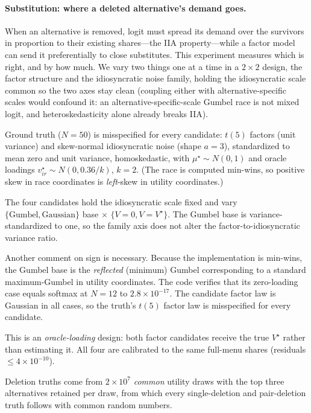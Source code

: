 \documentclass[12pt]{article}
\theoremstyle{remark}
\begin{document}
\paragraph{Substitution: where a deleted alternative's demand goes.}
When an alternative is removed, logit must spread its demand over the
survivors in proportion to their existing shares---the IIA property---while
a factor model can send it preferentially to close substitutes. This
experiment measures which is right, and by how much. We vary two things
one at a time in a $2\times2$ design, the factor structure and the
idiosyncratic noise family, holding the idiosyncratic scale common so
the two axes stay clean (coupling either with alternative-specific
scales would confound it: an alternative-specific-scale Gumbel race is
not mixed logit, and heteroskedasticity alone already breaks IIA).

Ground truth ($N = 50$) is misspecified for every candidate: $t(5)$ factors
(unit variance) and skew-normal idiosyncratic noise (shape $a = 3$),
standardized to mean zero and unit variance, homoskedastic, with $\mu^\star
\sim N(0,1)$ and oracle loadings $v^\star_{ir} \sim N(0, 0.36/k)$, $k=2$.
(The race is computed min-wins, so positive skew in race coordinates is
\emph{left}-skew in utility coordinates.)

The four candidates hold the idiosyncratic scale fixed and vary
$\{\text{Gumbel}, \text{Gaussian}\}$ base $\times$ $\{V = 0, V =
V^\star\}$. The Gumbel base is variance-standardized to one, so the
family axis does not alter the factor-to-idiosyncratic variance ratio.

Another comment on sign is necessary. Because the implementation is min-wins, the Gumbel base is the
\emph{reflected} (minimum) Gumbel corresponding to a standard
maximum-Gumbel in utility coordinates. The code verifies that
its zero-loading case equals softmax at $N=12$ to $2.8\times10^{-17}$.
The candidate factor law is Gaussian in all cases, so the truth's $t(5)$
factor law is misspecified for every candidate.

This is an \emph{oracle-loading} design: both factor
candidates receive the true $V^\star$ rather than estimating it. All four
are calibrated to the same full-menu shares (residuals $\le
4\times10^{-10}$).

Deletion truths come from $2\times10^7$ \emph{common} utility draws with
the top three alternatives retained per draw, from which every
single-deletion and pair-deletion truth follows with common random numbers.
\end{document}
